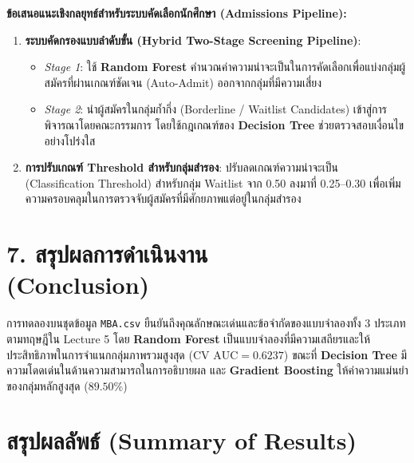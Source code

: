 \documentclass[12pt,a4paper]{article}
\begin{document}
\begin{ansbox}
\textbf{ข้อเสนอแนะเชิงกลยุทธ์สำหรับระบบคัดเลือกนักศึกษา (Admissions Pipeline):}
\begin{enumerate}[leftmargin=16pt, itemsep=2pt]
    \item \textbf{ระบบคัดกรองแบบลำดับขั้น (Hybrid Two-Stage Screening Pipeline)}:
    \begin{itemize}
        \item \textit{Stage 1}: ใช้ \textbf{Random Forest} คำนวณค่าความน่าจะเป็นในการคัดเลือกเพื่อแบ่งกลุ่มผู้สมัครที่ผ่านเกณฑ์ชัดเจน (Auto-Admit) ออกจากกลุ่มที่มีความเสี่ยง
        \item \textit{Stage 2}: นำผู้สมัครในกลุ่มก้ำกึ่ง (Borderline / Waitlist Candidates) เข้าสู่การพิจารณาโดยคณะกรรมการ โดยใช้กฎเกณฑ์ของ \textbf{Decision Tree} ช่วยตรวจสอบเงื่อนไขอย่างโปร่งใส
    \end{itemize}
    \item \textbf{การปรับเกณฑ์ Threshold สำหรับกลุ่มสำรอง}: ปรับลดเกณฑ์ความน่าจะเป็น (Classification Threshold) สำหรับกลุ่ม Waitlist จาก 0.50 ลงมาที่ 0.25--0.30 เพื่อเพิ่มความครอบคลุมในการตรวจจับผู้สมัครที่มีศักยภาพแต่อยู่ในกลุ่มสำรอง
\end{enumerate}
\end{ansbox}

\section*{7. สรุปผลการดำเนินงาน\\ \large(Conclusion)}

การทดลองบนชุดข้อมูล \texttt{MBA.csv} ยืนยันถึงคุณลักษณะเด่นและข้อจำกัดของแบบจำลองทั้ง 3 ประเภทตามทฤษฎีใน Lecture 5 โดย \textbf{Random Forest} เป็นแบบจำลองที่มีความเสถียรและให้ประสิทธิภาพในการจำแนกกลุ่มภาพรวมสูงสุด ($\text{CV AUC} = 0.6237$) ขณะที่ \textbf{Decision Tree} มีความโดดเด่นในด้านความสามารถในการอธิบายผล และ \textbf{Gradient Boosting} ให้ค่าความแม่นยำของกลุ่มหลักสูงสุด ($89.50\%$)

\section*{สรุปผลลัพธ์ (Summary of Results)}
\end{document}
